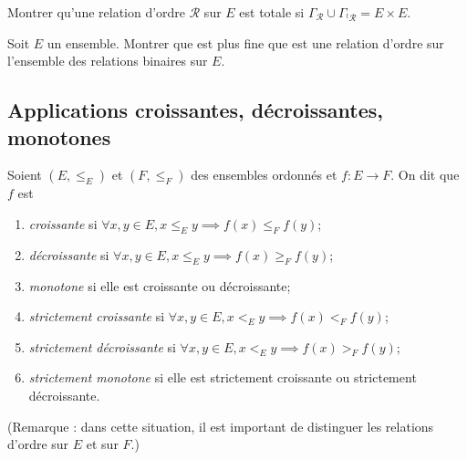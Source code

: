 \begin{exercice}
Montrer qu'une relation d'ordre $\mathcal R$ sur $E$ est totale si $\Gamma_\mathcal R \cup \Gamma_{{}^t\mathcal R} = E\times E$.
\end{exercice}



\begin{exercice}
Soit $E$ un ensemble. Montrer que \og est plus fine que\fg{} est une relation d'ordre sur l'ensemble des relations binaires sur $E$.
\end{exercice}


\subsection{Applications croissantes, décroissantes, monotones}


\begin{definition}
Soient $(E,\leq_E)$ et $(F,\leq_F)$ des ensembles ordonnés et $f : E\to F$. On dit que $f$ est 
\begin{enumerate}
\item \emph{croissante} si $\forall x, y\in E, x\leq_E y \implies f(x) \leq_F f(y)$;
\item \emph{décroissante} si $\forall x, y\in E, x\leq_E y \implies f(x) \geq_F f(y)$;
\item \emph{monotone} si elle est croissante ou décroissante;
\item \emph{strictement croissante} si $\forall x, y\in E, x<_E y \implies f(x) <_F f(y)$;
\item \emph{strictement décroissante} si $\forall x, y\in E, x<_E y \implies f(x) >_F f(y)$;
\item \emph{strictement monotone} si elle est strictement croissante ou strictement décroissante.
\end{enumerate}
\end{definition}

(Remarque : dans cette situation, il est important de distinguer les relations d'ordre sur $E$ et sur $F$.)

